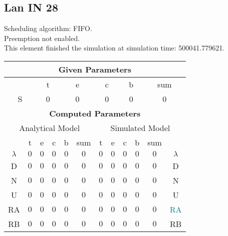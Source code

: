 \documentclass{article}
\begin{document}
\subsection{Lan IN 28}
Scheduling algorithm: FIFO.\\Preemption not enabled. \\This element finished the simulation at simulation time: 500041.779621.\\
\begin{table}[H]\centering\begin{tabular}{@{}c|cccc|c||cccc|c|c@{}}\toprule\multicolumn{12}{c}{\textbf{Given Parameters}}\\\midrule\multicolumn{2}{c|}{ } & \multicolumn{2}{c}{t} & \multicolumn{2}{c}{e} & \multicolumn{2}{c}{c} & \multicolumn{2}{c}{b} & \multicolumn{2}{|c}{sum} \\ \midrule\multicolumn{2}{c|}{S} & \multicolumn{2}{c}{0} & \multicolumn{2}{c}{0} & \multicolumn{2}{c}{0} & \multicolumn{2}{c}{0} & \multicolumn{2}{|c}{0}\\ \midrule\midrule\multicolumn{12}{c}{\textbf{Computed Parameters}}\\ \midrule\multicolumn{6}{c||}{Analytical Model} & \multicolumn{6}{c}{Simulated Model}\\ 
 \midrule & t & e & c & b & sum & t & e & c & b & sum &  \\ \midrule$\lambda$ &$0$ & $0$ & $0$ & $0$ & $0$ & $0$ & $0$ & $0$ & $0$ & $0$& $\lambda$ \\D & $0$ & $0$ & $0$ & $0$ & $0$ & $0$ & $0$ & $0$ & $0$ & $0$& D\\N & $0$ & $0$ & $0$ & $0$ & $0$ & $0$ & $0$ & $0$ & $0$ & $0$& N\\U & $0$ & $0$ & $0$ & $0$ & $0$ & $0$ & $0$ & $0$ & $0$ & $0$& U\\RA & $0$ & $0$ & $0$ & $0$ & $0$ & $0$ & $0$ & $0$ & $0$ & $0$& \textcolor{teal}{RA}\\RB & $0$ & $0$ & $0$ & $0$ & $0$ & $0$ & $0$ & $0$ & $0$ & $0$& RB\\
\bottomrule
\end{tabular}
\end{table}
\filbreak
\end{document}
